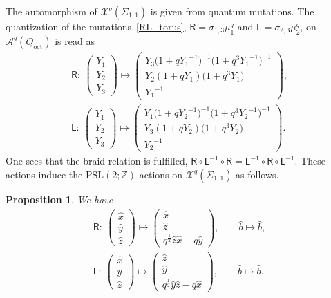 \documentclass[pdftex]{sigma}
\numberwithin{equation}{section}
\newtheorem{Proposition}[Theorem]{Proposition}
 { \theoremstyle{definition}
\newtheorem{Definition}[Theorem]{Definition}
\newtheorem{Note}[Theorem]{Note}
\newtheorem{Example}[Theorem]{Example}
\newtheorem{Remark}[Theorem]{Remark} }
\begin{document}
The automorphism of $\mathcal{X}^q(\Sigma_{1,1})$ is given from quantum mutations. The quantization of the mutations~\eqref{RL_torus}, $ \mathsf{R} = \sigma_{1,3} \mu^q_1$ and $ \mathsf{L} = \sigma_{2,3} \mu^q_2 $, on~$\mathcal{A}^q(Q_{\text{oct}})$ is read as
\begin{gather*}
 \mathsf{R}\colon \ \begin{pmatrix}
 Y_1 \\ Y_2 \\Y_3
 \end{pmatrix}
 \mapsto
 \begin{pmatrix}
 Y_3 \big( 1 + q {Y_1}^{-1}\big)^{-1} \big( 1+q^3 {Y_1}^{-1} \big)^{-1} \\
 Y_2 ( 1+q Y_1) \big( 1+q^3 Y_1 \big) \\
 {Y_1}^{-1}
 \end{pmatrix}, \\
 \mathsf{L}\colon \
 \begin{pmatrix}
 Y_1 \\ Y_2 \\Y_3
 \end{pmatrix}
 \mapsto
 \begin{pmatrix}
 Y_1 \big( 1 + q {Y_2}^{-1}\big)^{-1} \big( 1+q^3 {Y_2}^{-1} \big)^{-1} \\
 Y_3 (1+q Y_2) \big( 1+q^3 Y_2 \big) \\
 {Y_2}^{-1}
 \end{pmatrix}.
\end{gather*}
One sees that the braid relation is fulfilled, $\mathsf{R} \circ \mathsf{L}^{-1} \circ \mathsf{R} =\mathsf{L}^{-1} \circ \mathsf{R} \circ \mathsf{L}^{-1}$. These actions induce the $\mathrm{PSL}(2;\mathbb{Z})$ actions on $\mathcal{X}^q(\Sigma_{1,1})$ as follows.
\begin{Proposition} We have
 \begin{gather*}
 \mathsf{R}\colon \ \begin{pmatrix}
 \hat{x} \\
 \hat{y} \\
 \hat{z}
 \end{pmatrix}
 \mapsto
 \begin{pmatrix}
 \hat{x} \\
 \hat{z} \\
 q^{\frac{1}{2}} \hat{z} \hat{x} - q \hat{y}
 \end{pmatrix} , \qquad
 \hat{b} \mapsto \hat{b}, \\
 \mathsf{L}\colon \ \begin{pmatrix}
 \hat{x} \\
 \hat{y} \\
 \hat{z}
 \end{pmatrix}
 \mapsto
 \begin{pmatrix}
 \hat{z} \\
 \hat{y} \\
 q^{\frac{1}{2}} \hat{y} \hat{z} - q \hat{x}
 \end{pmatrix}, \qquad
 \hat{b} \mapsto \hat{b}.
 \end{gather*}
\end{Proposition}
\end{document}
